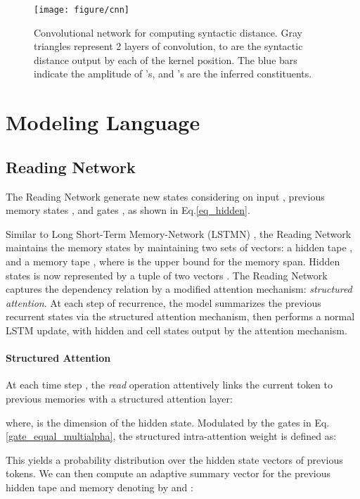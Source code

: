\documentclass{article} \usepackage{iclr2018_conference,times}
\begin{document}
\begin{figure}[h]
  \centering
  \texttt{[image: figure/cnn]}
  \caption{Convolutional network for computing syntactic distance. Gray triangles represent 2 layers of convolution,
 to  are the syntactic distance output by each of the kernel position. The blue bars indicate the amplitude of 's, and 's are the inferred constituents.}
\label{fig_conv}
\end{figure}






\section{Modeling Language}
\subsection{Reading Network} \label{sec_reading}
The Reading Network generate new states  considering on input , previous memory states , and gates , as shown in Eq.\ref{eq_hidden}.

Similar to Long Short-Term Memory-Network (LSTMN) \citep{cheng2016long}, the Reading Network maintains the memory states by maintaining two sets of vectors: a hidden tape , and a memory tape , where  is the upper bound for the memory span. Hidden states  is now represented by a tuple of two vectors . The Reading Network captures the dependency relation by a modified attention mechanism: \emph{structured attention}. At each step of recurrence, the model summarizes the previous recurrent states via the structured attention mechanism, then performs a normal LSTM update, with hidden and cell states output by the attention mechanism. 

\paragraph{Structured Attention} At each time step , the \textit{read} operation attentively links the current token to previous memories with a structured attention layer:

where,  is the dimension of the hidden state. 
Modulated by the gates in Eq.\ref{gate_equal_multialpha}, the structured intra-attention weight is defined as:

This yields a probability distribution over the hidden state vectors of previous tokens. 
We can then compute an adaptive summary vector for the previous hidden tape and memory denoting by  and :
\end{document}
